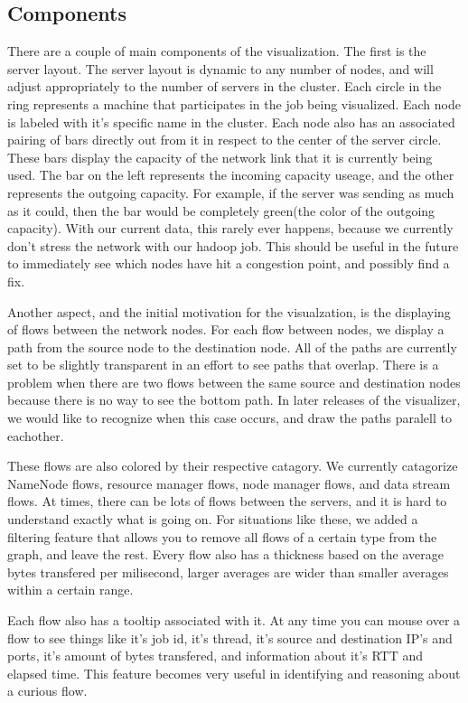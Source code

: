 \subsection{Components}
\label{ssec:comp}
There are a couple of main components of the visualization. The first
is the server layout. The server layout is dynamic to any number of
nodes, and will adjust appropriately to the number of servers in the
cluster. Each circle in the ring represents a machine that
participates in the job being visualized. Each node is labeled with
it's specific name in the cluster. Each node also has an associated
pairing of bars directly out from it in respect to the center of the
server circle. These bars display the capacity of the network
link that it is currently being used. The bar on the left represents
the incoming capacity useage, and the other represents the outgoing
capacity. For example, if the server was sending as much as it could,
then the bar would be completely green(the color of the outgoing
capacity). With our current data, this rarely ever happens, because we
currently don't stress the network with our hadoop job. This should be
useful in the future to immediately see which nodes have hit a
congestion point, and possibly find a fix.

Another aspect, and the initial motivation for the visualzation, is the
displaying of flows between the network nodes. For each flow between
nodes, we display a path from the source node to the destination node.
All of the paths are currently set to be slightly transparent in an
effort to see paths that overlap. There is a problem when there are
two flows between the same source and destination nodes because there
is no way to see the bottom path. In later releases of the visualizer,
we would like to recognize when this case occurs, and draw the paths
paralell to eachother.

These flows are also colored by their respective catagory. We
currently catagorize NameNode flows, resource manager flows, node
manager flows, and data stream flows. At times, there can be lots
of flows between the servers, and it is hard to understand exactly
what is going on. For situations like these, we added a filtering
feature that allows you to remove all flows of a certain type from the
graph, and leave the rest. Every flow also has a thickness based on
the average bytes transfered per milisecond, larger averages are wider
than smaller averages within a certain range.

Each flow also has a tooltip associated with it. At any time you can
mouse over a flow to see things like it's job id, it's thread, it's
source and destination IP's and ports, it's amount of bytes
transfered, and information about it's RTT and elapsed time. This
feature becomes very useful in identifying and reasoning about a
curious flow.

